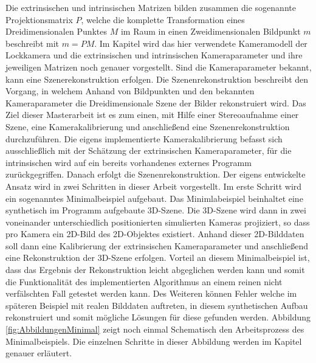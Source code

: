 Die extrinsischen und intrinsischen Matrizen bilden zusammen die sogenannte Projektionsmatrix $P$, welche die komplette Transformation eines Dreidimensionalen Punktes $M$ im Raum in einen Zweidimensionalen Bildpunkt $m$ beschreibt mit $m = PM$. Im Kapitel  wird das hier verwendete Kameramodell der Lockkamera und die extrinsischen und intrinsischen Kameraparameter und ihre jeweiligen Matrizen noch genauer vorgestellt. Sind die Kameraparameter bekannt, kann eine Szenerekonstruktion erfolgen. Die Szenenrekonstruktion beschreibt den Vorgang, in welchem Anhand von Bildpunkten und den bekannten Kameraparameter die Dreidimensionale Szene der Bilder rekonstruiert wird. Das Ziel dieser Masterarbeit ist es zum einen, mit Hilfe einer Stereoaufnahme einer Szene, eine Kamerakalibrierung und anschließend eine Szenenrekonstruktion durchzuführen. Die eigens implementierte Kamerakalibrierung befasst sich ausschließlich mit der Schätzung der extrinsischen Kameraparameter, für die intrinsischen wird auf ein bereits vorhandenes externes Programm zurückgegriffen. Danach erfolgt die Szenenrekonstruktion. Der eigens entwickelte Ansatz wird in zwei Schritten in dieser Arbeit vorgestellt. Im erste Schritt wird ein sogenanntes Minimalbeispiel aufgebaut. Das Minimlabeispiel beinhaltet eine synthetisch im Programm aufgebaute 3D-Szene. Die 3D-Szene wird dann in zwei voneinander unterschiedlich positionierten simulierten Kameras projiziert, so dass pro Kamera ein 2D-Bild des 2D-Objektes existiert. Anhand dieser 2D-Bilddaten soll dann eine Kalibrierung der extrinsischen Kameraparameter und anschließend eine Rekonstruktion der 3D-Szene erfolgen. Vorteil an diesem Minimalbeispiel ist, dass das Ergebnis der Rekonstruktion leicht abgeglichen werden kann und somit die Funktionalität des implementierten Algorithmus an einem reinen nicht verfälschten Fall getestet werden kann. Des Weiteren können Fehler welche im späteren Beispiel mit realen Bilddaten auftreten, in diesem synthetischen Aufbau rekonstruiert und somit mögliche Lösungen für diese gefunden werden. Abbildung \ref{fig:AbbildungenMinimal} zeigt noch einmal Schematisch den Arbeitsprozess des Minimalbeispiels. Die einzelnen Schritte in dieser Abbildung werden im Kapitel  genauer erläutert. 


